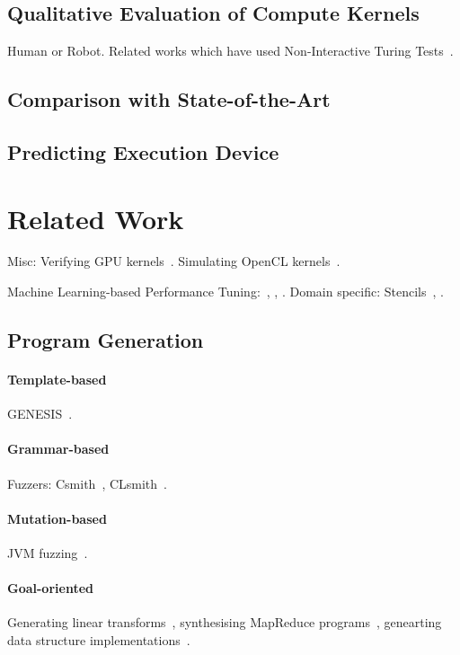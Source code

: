 \documentclass[preprint,nonatbib,10pt,nocopyrightspace]{sigplanconf}
\begin{document}
\subsection{Qualitative Evaluation of Compute Kernels}\label{subsec:}

Human or Robot. Related works which have used Non-Interactive Turing
Tests~\cite{Gao2015a,Zhang2016}.

\subsection{Comparison with State-of-the-Art}\label{subsec:}

\subsection{Predicting Execution Device}\label{subsec:}


\section{Related Work}\label{sec:related-work}

Misc: Verifying GPU kernels~\cite{Betts2012}. Simulating OpenCL
kernels~\cite{Price2015}.

Machine Learning-based Performance Tuning:~\cite{Wen2015},
\cite{Magni2014}, \cite{Falch2015}. Domain specific:
Stencils~\cite{Garvey2015b}, \cite{Cummins2015a}.

\subsection{Program Generation}

\paragraph{Template-based} GENESIS~\cite{Chiu2015}.


\paragraph{Grammar-based} Fuzzers:
Csmith~\cite{Yang2012}, CLsmith~\cite{Pflanzer2016}.


\paragraph{Mutation-based} JVM fuzzing~\cite{Chena}.


\paragraph{Goal-oriented} Generating linear
transforms~\cite{Voronenko2009}, synthesising MapReduce
programs~\cite{Smith}, genearting data structure
implementations~\cite{Loncaric2016}.
\end{document}
